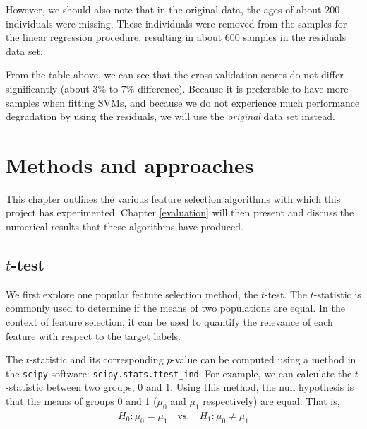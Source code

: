 \documentclass[12pt, twoside, a4paper]{report}
\begin{document}
However, we should also note that in the original data, the ages of about 200 individuals were missing. These individuals were removed from the samples for the linear regression procedure, resulting in about 600 samples in the residuals data set.

From the table above, we can see that the cross validation scores do not differ significantly (about 3\% to 7\% difference). Because it is preferable to have more samples when fitting SVMs, and because we do not experience much performance degradation by using the residuals, we will use the \textit{original} data set instead.


\chapter{Methods and approaches}
\label{methods}

This chapter outlines the various feature selection algorithms with which this project has experimented. Chapter \ref{evaluation} will then present and discuss the numerical results that these algorithms have produced. 

\section{$t$-test} \label{t-test}

We first explore one popular feature selection method, the $t$-test. The $t$-statistic is commonly used to determine if the means of two populations are equal. In the context of feature selection, it can be used to quantify the relevance of each feature with respect to the target labels.

The $t$-statistic and its corresponding $p$-value can be computed using a method in the \texttt{scipy} \cite{scipy} software: \texttt{scipy.stats.ttest\_ind}. For example, we can calculate the $t$-statistic between two groups, 0 and 1. Using this method, the null hypothesis is that the means of groups 0 and 1 ($\mu_0$ and $\mu_1$ respectively) are equal. That is,
\begin{align*}
H_0: \mu_0 = \mu_1 \quad \text{vs.} \quad H_1: \mu_0 \neq \mu_1
\end{align*}
\end{document}
